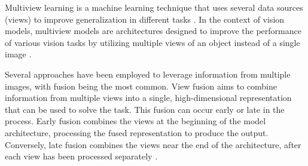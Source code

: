 Multiview learning is a machine learning technique that uses several data sources (views) to improve generalization in different tasks \cite{multiview_a_surview}. In the context of vision models, multiview models are architectures designed to improve the performance of various vision tasks by utilizing multiple views of an object instead of a single image \cite{multiview_hybrid_fusion_mutual_distill}.

Several approaches have been employed to leverage information from multiple images, with fusion being the most common. View fusion aims to combine information from multiple views into a single, high-dimensional representation that can be used to solve the task. This fusion can occur early or late in the process. Early fusion combines the views at the beginning of the model architecture, processing the fused representation to produce the output. Conversely, late fusion combines the views near the end of the architecture, after each view has been processed separately \cite{multiview_a_surview, multiview_hybrid_fusion_mutual_distill}.